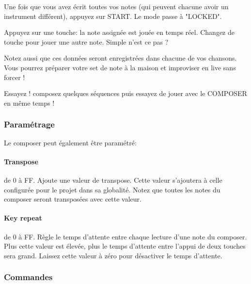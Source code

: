 \documentclass[12pt,a4paper]{article}
\begin{document}
    Une fois que vous avez écrit toutes vos notes (qui peuvent chacune avoir un instrument différent), appuyez sur START. Le mode passe à "LOCKED".\medskip

    Appuyez sur une touche: la note assignée est jouée en temps réel. Changez de touche pour jouer une autre note. Simple n'est ce pas ?\medskip

    Notez aussi que ces données seront enregistrées dans chacune de vos chansons. Vous pourrez préparer votre set de note à la maison et improviser en live sans forcer !\medskip

    Essayez ! composez quelques séquences puis essayez de jouer avec le COMPOSER en même temps !\medskip

    \subsubsection{Paramétrage}

    Le composer peut également être paramétré:


        \paragraph{Transpose} de 0 à FF. Ajoute une valeur de transpose. Cette valeur s'ajoutera à celle configurée pour le projet dans sa globalité. Notez que toutes les notes du composer seront transposées avec cette valeur.

        \paragraph{Key repeat} de 0 à FF. Règle le temps d'attente entre chaque lecture d'une note du composer. Plus cette valeur est élevée, plus le temps d'attente entre l'appui de deux touches sera grand. Laissez cette valeur à zéro pour désactiver le temps d'attente.

        \subsubsection{Commandes}
\end{document}
